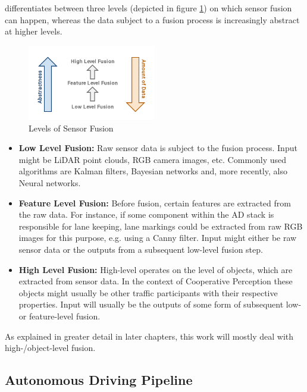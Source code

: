 \cite{Chen2019} differentiates between three levels (depicted in figure  \ref{fig:fusion_levels}) on which sensor fusion can happen, whereas the data subject to a fusion process is increasingly abstract at higher levels. 

\begin{figure}[H]
	\centering
	\includegraphics[width=0.5\textwidth]{98_images/fusion_levels.png}
	\caption{Levels of Sensor Fusion}
	\label{fig:fusion_levels}
\end{figure}

\begin{itemize}
	\item \textbf{Low Level Fusion:} Raw sensor data is subject to the fusion process. Input might be LiDAR point clouds, RGB camera images, etc. Commonly used algorithms are Kalman filters, Bayesian networks and, more recently, also Neural networks.
	\item \textbf{Feature Level Fusion:} Before fusion, certain features are extracted from the raw data. For instance, if some component within the AD stack is responsible for lane keeping, lane markings could be extracted from raw RGB images for this purpose, e.g. using a Canny filter. Input might either be raw sensor data or the outputs from a subsequent low-level fusion step.
	\item \textbf{High Level Fusion:} High-level operates on the level of objects, which are extracted from sensor data. In the context of Cooperative Perception these objects might usually be other traffic participants with their respective properties. Input will usually be the outputs of some form of subsequent low- or feature-level fusion.
\end{itemize}

As explained in greater detail in later chapters, this work will mostly deal with high-/object-level fusion. 


\subsection{Autonomous Driving Pipeline}
\label{subsec:background:autonomous_driving_pipeline}

